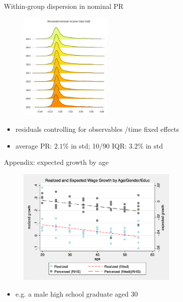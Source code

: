 \documentclass{beamer}
\begin{document}
\begin{frame}{Within-group dispersion in nominal PR}
	\label{appendix:incstd}
	\begin{figure}
		\centering
		\includegraphics[width=0.4\textwidth]{figures/joy_incstd.jpg}
	\end{figure}
	\begin{itemize}
		\item  residuals controlling for observables /time fixed effects
		\item average PR:  $2.1\%$ in std; 10/90 IQR: $3.2\%$ in std \quad \hyperlink{rincstd_hist}{}    
	\end{itemize}
\end{frame}

\begin{frame}{Appendix: expected growth by age}
	\begin{figure}[ht]
		\label{appendix:age_gender_educ_level_compare_figure}
		\centering
		\includegraphics[width=0.7\textwidth]{figures/real_log_wage_gr_level_by_age_edu_gender_compare.png}
	\end{figure}
	\begin{itemize}
		\item e.g. a male high school graduate aged 30 
	\end{itemize}
\end{frame}
\end{document}
